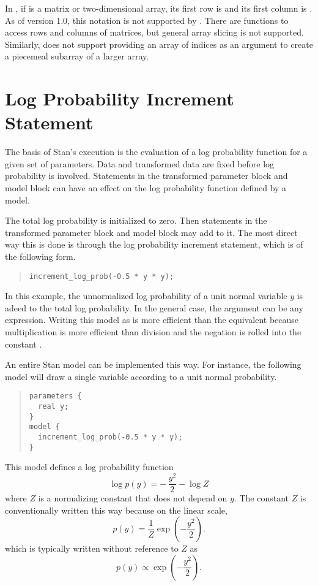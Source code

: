 In \R, if  is a matrix or two-dimensional array, its first row
is  and its first column is .  As of version
1.0, this notation is not supported by \Stan.  There are functions to
access rows and columns of matrices, but general array slicing is not
supported.  Similarly,  does not support providing an array of
indices as an argument to create a piecemeal subarray of a larger
array.

\section{Log Probability Increment Statement}

The basis of Stan's execution is the evaluation of a log probability
function for a given set of parameters.  Data and transformed data are
fixed before log probability is involved.  Statements in the
transformed parameter block and model block can have an effect on the
log probability function defined by a model.

The total log probability is initialized to zero.  Then statements in
the transformed parameter block and model block may add to it.  The
most direct way this is done is through the log probability increment
statement, which is of the following form.
%
\begin{quote}
\begin{Verbatim}
increment_log_prob(-0.5 * y * y);
\end{Verbatim}
\end{quote}
%
In this example, the unnormalized log probability of a unit normal
variable $y$ is adeed to the total log probability.  In the general
case, the argument can be any expression.  Writing this model as
 is more efficient than the equivalent  because multiplication is more efficient than division and the
negation is rolled into the constant .

An entire Stan model can be implemented this way.  For instance, the
following model will draw a single variable according to a unit normal
probability.  
%
\begin{quote}
\begin{Verbatim}
parameters {
  real y;
}
model {
  increment_log_prob(-0.5 * y * y);
}
\end{Verbatim}
\end{quote}
%
This model defines a log probability function 
%
\[
\log p(y) = - \, \frac{y^2}{2} - \log Z
\]
%
where $Z$ is a normalizing constant that does not depend on $y$.  The
constant $Z$ is conventionally written this way because on the linear
scale,
\[
p(y) = \frac{1}{Z} \exp\left(-\frac{y^2}{2}\right).
\]
which is typically written without reference to $Z$ as
\[
p(y) \propto \exp\left(-\frac{y^2}{2}\right).
\]

